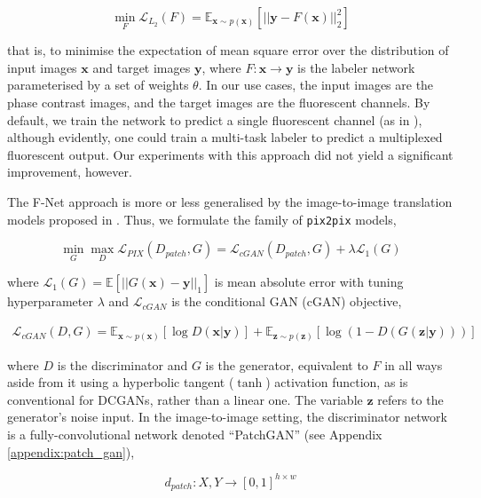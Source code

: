 \begin{equation}
\min_F \mathcal{L}_{L_2}(F) = \mathbb{E}_{\mathbf{x} \sim p(\mathbf{x})}[||\mathbf{y} - F(\mathbf{x})||_2^2]
\label{eq:l2_loss}
\end{equation}

that is, to minimise the expectation of mean square error over the distribution of input images $\mathbf{x}$ and target images $\mathbf{y}$, where $F : \mathbf{x} \to \mathbf{y}$ is the labeler network parameterised by a set of weights $\theta$. In our use cases, the input images are the phase contrast images, and the target images are the fluorescent channels. By default, we train the network to predict a single fluorescent channel (as in \cite{ounkomol2018label}), although evidently, one could train a multi-task labeler to predict a multiplexed fluorescent output. Our experiments with this approach did not yield a significant improvement, however.

The F-Net approach is more or less generalised by the image-to-image translation models proposed in \cite{isola2017image}. Thus, we formulate the family of \texttt{pix2pix} models,

\begin{equation}
\min_G\max_D\mathcal{L}_{PIX}(D_{patch}, G) = \mathcal{L}_{cGAN}(D_{patch}, G) + \lambda\mathcal{L}_{1}(G)
\label{eq:pix2pix_loss}
\end{equation}

where $\mathcal{L}_{1}(G) = \mathbb{E}[||G(\mathbf{x}) - \mathbf{y}||_1]$ is mean absolute error with tuning hyperparameter $\lambda$ and $\mathcal{L}_{cGAN}$ is the conditional GAN (cGAN) objective,

\begin{align}\mathcal{L}_{cGAN}(D, G) = \mathbb{E}_{\mathbf{x} \sim p(\mathbf{x})}[\log D(\mathbf{x} | \mathbf{y})] + \mathbb{E}_{\mathbf{z} \sim p(\mathbf{z})}[\log(1 - D(G(\mathbf{z} | \mathbf{y})))]
\end{align}

where $D$ is the discriminator and $G$ is the generator, equivalent to $F$ in all ways aside from it using a hyperbolic tangent ($\tanh$) activation function, as is conventional for DCGANs, rather than a linear one. The variable $\mathbf{z}$ refers to the generator's noise input. In the image-to-image setting, the discriminator network is a fully-convolutional network denoted ``PatchGAN'' (see Appendix \ref{appendix:patch_gan}),

\begin{equation}
d_{patch} : X, Y \to [0, 1]^{h\times w}
\end{equation}

